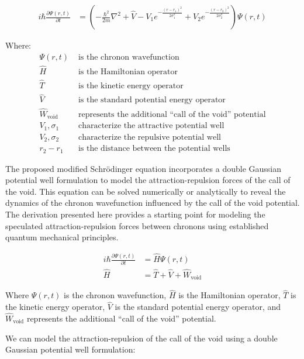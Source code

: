 \documentclass{article}
\begin{document}
\begin{align*}
i\hbar\frac{\partial \Psi(r,t)}{\partial t} &= \left(-\frac{\hbar^2}{2m}\nabla^2 + \hat{V} -V_1 e^{-\frac{(r-r_1)^2}{2\sigma_1^2}} + V_2 e^{-\frac{(r-r_2)^2}{2\sigma_2^2}} \right)\Psi(r,t)
\end{align*}

Where:
\begin{align*}
\Psi(r,t) &\text{ is the chronon wavefunction} \\
\hat{H} &\text{ is the Hamiltonian operator} \\
\hat{T} &\text{ is the kinetic energy operator} \\
\hat{V} &\text{ is the standard potential energy operator} \\
\hat{W}_{\text{void}} &\text{ represents the additional ``call of the void'' potential} \\
V_1, \sigma_1 &\text{ characterize the attractive potential well} \\
V_2, \sigma_2 &\text{ characterize the repulsive potential well} \\
r_2 - r_1 &\text{ is the distance between the potential wells}
\end{align*}

The proposed modified Schrödinger equation incorporates a double Gaussian potential well formulation to model the attraction-repulsion forces of the call of the void. This equation can be solved numerically or analytically to reveal the dynamics of the chronon wavefunction influenced by the call of the void potential. The derivation presented here provides a starting point for modeling the speculated attraction-repulsion forces between chronons using established quantum mechanical principles.

\begin{align*}
i\hbar\frac{\partial \Psi(r,t)}{\partial t} &= \hat{H}\Psi(r,t) \\
\hat{H} &= \hat{T} + \hat{V} + \hat{W}_{\text{void}} %
\end{align*}

Where $\Psi(r,t)$ is the chronon wavefunction, $\hat{H}$ is the Hamiltonian operator, $\hat{T}$ is the kinetic energy operator, $\hat{V}$ is the standard potential energy operator, and $\hat{W}_{\text{void}}$ represents the additional ``call of the void'' potential.

We can model the attraction-repulsion of the call of the void using a double Gaussian potential well formulation:
\end{document}
